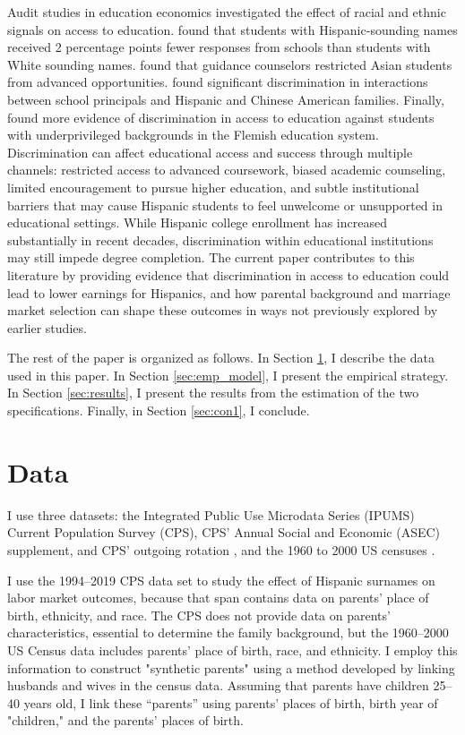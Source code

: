 Audit studies in education economics investigated the effect of racial and ethnic signals on access to education. \textcite{bergman2018education} found that students with Hispanic-sounding names received 2 percentage points fewer responses from schools than students with White sounding names. \textcite{janssen2022guidance} found that guidance counselors restricted Asian students from advanced opportunities. \textcite{gaddis2024racial} found significant discrimination in interactions between school principals and Hispanic and Chinese American families. Finally, \textcite{bourabain2023school} found more evidence of discrimination in access to education against students with underprivileged backgrounds in the Flemish education system. Discrimination can affect educational access and success through multiple channels: restricted access to advanced coursework, biased academic counseling, limited encouragement to pursue higher education, and subtle institutional barriers that may cause Hispanic students to feel unwelcome or unsupported in educational settings. While Hispanic college enrollment has increased substantially in recent decades, discrimination within educational institutions may still impede degree completion. The current paper contributes to this literature by providing evidence that discrimination in access to education could lead to lower earnings for Hispanics, and how parental background and marriage market selection can shape these outcomes in ways not previously explored by earlier studies.

The rest of the paper is organized as follows. In Section \ref{sec:data}, I describe the data used in this paper. In Section \ref{sec:emp_model}, I present the empirical strategy. In Section \ref{sec:results}, I present the results from the estimation of the two specifications. Finally, in Section \ref{sec:con1}, I conclude.

\section{Data}\label{sec:data}

I use three datasets:  the Integrated Public Use Microdata Series (IPUMS) Current Population Survey (CPS), CPS' Annual Social and Economic (ASEC) supplement, and CPS' outgoing rotation \autocite{cps2019}, and the 1960 to 2000 US censuses \autocite{acs2019}. 

I use the 1994–2019 CPS data set to study the effect of Hispanic surnames on labor market outcomes, because that span contains data on parents’ place of birth, ethnicity, and race. The CPS does not provide data on parents’ characteristics, essential to determine the family background, but the 1960–2000 US Census data includes parents’ place of birth, race, and ethnicity. I employ this information to construct "synthetic parents" using a method developed by \textcite{rubinstein2014pride} linking husbands and wives  in the census data. Assuming that parents have children 25–40 years old, I link these “parents” using parents’ places of birth, birth year of "children," and the parents’ places of birth.

